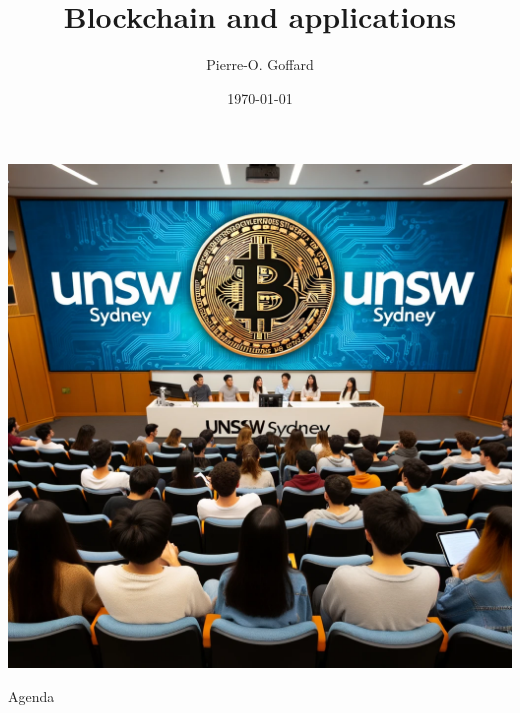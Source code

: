 \documentclass{beamer}
\title[UNSW Workshop]{Blockchain and applications}
\author{Pierre-O. Goffard}
\institute[UNISTRA]{Université de Strasbourg\\
 \texttt{goffard@unistra.fr}
}
\date{\today}
\begin{document}
\begin{frame}[plain]
  \includegraphics[width=\textwidth]{../../Figures/DALL-E/WS_UNSW_DEFI.png}
\end{frame}
\begin{frame}
  \titlepage
\end{frame}
\begin{frame}{Agenda}
  \tableofcontents
\end{frame}
\end{document}

